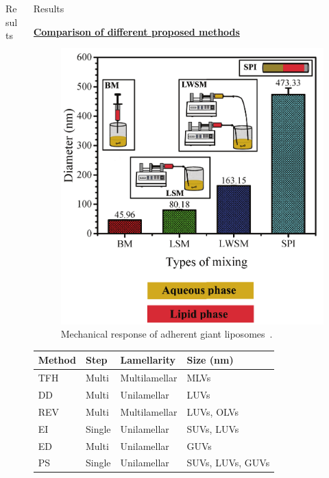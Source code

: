 \documentclass[20pt]{beamer}
\begin{document}
\begin{frame}[t]
\begin{columns}[t]
\begin{column}{0.32\linewidth}
\begin{block}{Results}
\vspace{3.7cm} 
\end{block}		 
\end{column}	

\begin{column}{0.32\linewidth}	
\begin{block}{Results}

\textbf{\underline{Comparison of different proposed methods}}

\vspace{1cm}

\begin{figure}
	\includegraphics[width=0.74\linewidth]{res5}
	\caption{Mechanical response of adherent giant liposomes~\cite{sorkin2018nanomechanics}.}
\end{figure}  	

\vspace{1cm}

\begin{table}\small 
	\begin{tabular}{llll}	
		\toprule
		Method & Step & Lamellarity &  Size (nm) \\
		\midrule
		TFH & Multi & Multilamellar & MLVs \\
		DD & Multi & Unilamellar & LUVs \\
		REV & Multi & Multilamellar & LUVs, OLVs\\
		EI & Single & Unilamellar & SUVs, LUVs \\
		ED & Multi & Unilamellar & GUVs \\
		PS & Single &  Unilamellar & SUVs, LUVs, GUVs \\
		\bottomrule
	\end{tabular}	
\end{table}	
	

\end{block}
\end{column}
\end{columns}
\end{frame}
\end{document}
